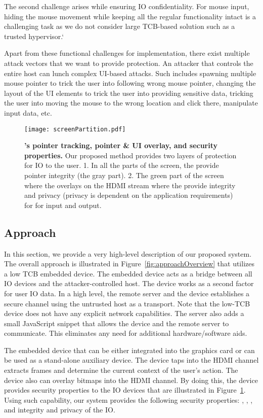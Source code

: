 The second challenge arises while ensuring IO confidentiality. For mouse input, hiding the mouse movement while keeping all the regular functionality intact is a challenging task as we do not consider large TCB-based solution such as a trusted hypervisor.`


Apart from these functional challenges for implementation, there exist multiple attack vectors that we want to provide protection. An attacker that controls the entire host can lunch complex UI-based attacks. Such includes spawning multiple mouse pointer to trick the user into following wrong mouse pointer, changing the layout of the UI elements to trick the user into providing sensitive data, tricking the user into moving the mouse to the wrong location and click there, manipulate input data, etc.


\begin{figure}[t]
\centering
\texttt{[image: screenPartition.pdf]}
\caption{\textbf{\device's pointer tracking, pointer \& UI overlay, and security properties.} Our proposed method provides two layers of protection for IO to the user. 1. In all the parts of the screen, the \device provide pointer integrity (the gray part). 2. The green part of the screen where the \device overlays on the HDMI stream where the \device provide integrity and privacy (privacy is dependent on the application requirements) for for input and output.}
\label{fig:screenPartition}
\centering
\end{figure}

\subsection{Approach}

In this section, we provide a very high-level description of our proposed system. 
The overall approach is illustrated in Figure~\ref{fig:approachOverview} that utilizes a low TCB embedded device. The embedded device acts as a bridge between all IO devices and the attacker-controlled host. The device works as a second factor for user IO data. In a high level, the remote server and the device establishes a secure channel using the untrusted host as a transport. Note that the low-TCB device does not have any explicit network capabilities. The server also adds a small JavaScript snippet that allows the device and the remote server to communicate. This eliminates any need for additional hardware/software aids.

The embedded device that can be either integrated into the graphics card or can be used as a stand-alone auxiliary device. The device taps into the HDMI channel extracts frames and determine the current context of the user's action. The device also can overlay bitmaps into the HDMI channel. By doing this, the device provides security properties to the IO devices that are illustrated in Figure~\ref{fig:screenPartition}. Using such capability, our system provides the following security properties: \emph{\pop}, \emph{\poui}, \emph{\poa}, and integrity and privacy of the IO.

